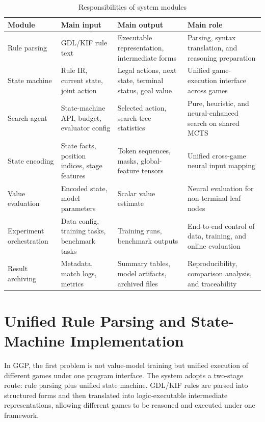\begin{table}[htbp]
\centering
\caption{Responsibilities of system modules}
\label{tab:system_module_responsibilities}
\begin{tabular}{p{2.0cm}p{3.2cm}p{3.0cm}p{4.1cm}}
\toprule
Module & Main input & Main output & Main role \\
\midrule
Rule parsing & GDL/KIF rule text & Executable representation, intermediate forms & Parsing, syntax translation, and reasoning preparation \\
State machine & Rule IR, current state, joint action & Legal actions, next state, terminal status, goal value & Unified game-execution interface across games \\
Search agent & State-machine API, budget, evaluator config & Selected action, search-tree statistics & Pure, heuristic, and neural-enhanced search on shared MCTS \\
State encoding & State facts, position indices, stage features & Token sequences, masks, global-feature tensors & Unified cross-game neural input mapping \\
Value evaluation & Encoded state, model parameters & Scalar value estimate & Neural evaluation for non-terminal leaf nodes \\
Experiment orchestration & Data config, training tasks, benchmark tasks & Training runs, benchmark outputs & End-to-end control of data, training, and online evaluation \\
Result archiving & Metadata, match logs, metrics & Summary tables, model artifacts, archived files & Reproducibility, comparison analysis, and traceability \\
\bottomrule
\end{tabular}
\end{table}


\section{Unified Rule Parsing and State-Machine Implementation}

In GGP, the first problem is not value-model training but unified execution of different games under one program interface. The system adopts a two-stage route: rule parsing plus unified state machine. GDL/KIF rules are parsed into structured forms and then translated into logic-executable intermediate representations, allowing different games to be reasoned and executed under one framework.


